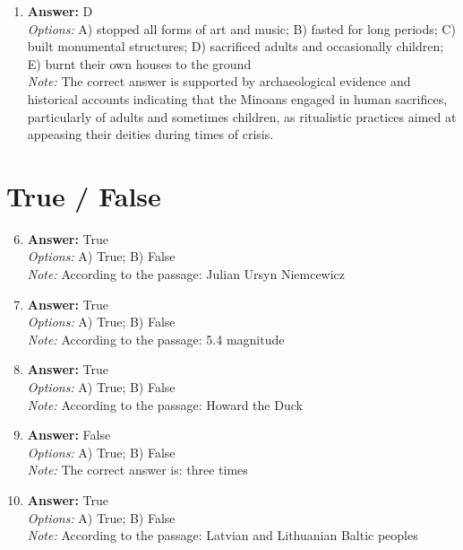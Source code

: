 \documentclass[12pt]{article}
\begin{document}
\begin{enumerate}[label=\arabic*.]
\\ \textit{Options:} A) Madagascar; B) Australia; C) Hawaii; D) New Zealand; E) The Maldives
\\ \textit{Note:} New Zealand was among the last major landmasses to be settled by humans, with Polynesians arriving around 1250-1300 CE, making it significantly later than other regions inhabited by humans.
\item \textbf{Answer:} D
\\ \textit{Options:} A) stopped all forms of art and music; B) fasted for long periods; C) built monumental structures; D) sacrificed adults and occasionally children; E) burnt their own houses to the ground
\\ \textit{Note:} The correct answer is supported by archaeological evidence and historical accounts indicating that the Minoans engaged in human sacrifices, particularly of adults and sometimes children, as ritualistic practices aimed at appeasing their deities during times of crisis.
\end{enumerate}

\section*{True / False}
\begin{enumerate}[label=\arabic*.]
\setcounter{enumi}{5}
\item \textbf{Answer:} True
\\ \textit{Options:} A) True; B) False
\\ \textit{Note:} According to the passage: Julian Ursyn Niemcewicz
\item \textbf{Answer:} True
\\ \textit{Options:} A) True; B) False
\\ \textit{Note:} According to the passage: 5.4 magnitude
\item \textbf{Answer:} True
\\ \textit{Options:} A) True; B) False
\\ \textit{Note:} According to the passage: Howard the Duck
\item \textbf{Answer:} False
\\ \textit{Options:} A) True; B) False
\\ \textit{Note:} The correct answer is: three times
\item \textbf{Answer:} True
\\ \textit{Options:} A) True; B) False
\\ \textit{Note:} According to the passage: Latvian and Lithuanian Baltic peoples
\end{enumerate}
\end{document}
